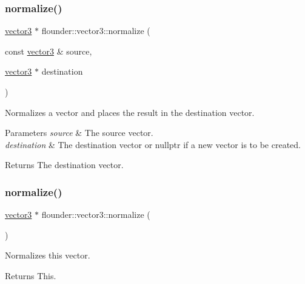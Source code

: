 \subsubsection{\texorpdfstring{normalize()}{normalize()}\hspace{0.1cm}{\footnotesize\ttfamily [1/2]}}
{\footnotesize\ttfamily \hyperlink{classflounder_1_1vector3}{vector3} $\ast$ flounder\+::vector3\+::normalize (\begin{DoxyParamCaption}\item[{const \hyperlink{classflounder_1_1vector3}{vector3} \&}]{source,  }\item[{\hyperlink{classflounder_1_1vector3}{vector3} $\ast$}]{destination }\end{DoxyParamCaption})\hspace{0.3cm}{\ttfamily [static]}}



Normalizes a vector and places the result in the destination vector. 


\begin{DoxyParams}{Parameters}
{\em source} & The source vector. \\
\hline
{\em destination} & The destination vector or nullptr if a new vector is to be created. \\
\hline
\end{DoxyParams}
\begin{DoxyReturn}{Returns}
The destination vector. 
\end{DoxyReturn}
\mbox{\label{classflounder_1_1vector3_aabd9f495ffdbd3988227ca9b1bf5f794}} 
\subsubsection{\texorpdfstring{normalize()}{normalize()}\hspace{0.1cm}{\footnotesize\ttfamily [2/2]}}
{\footnotesize\ttfamily \hyperlink{classflounder_1_1vector3}{vector3} $\ast$ flounder\+::vector3\+::normalize (\begin{DoxyParamCaption}{ }\end{DoxyParamCaption})}



Normalizes this vector. 

\begin{DoxyReturn}{Returns}
This. 
\end{DoxyReturn}
\mbox{\label{classflounder_1_1vector3_a70876957cd503a2c1d3189906042d1ae}} 
